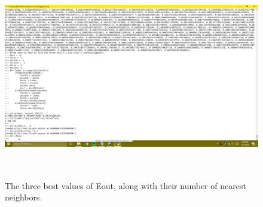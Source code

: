 \documentclass[a4paper]{article}
\begin{document}
\begin{figure}
  \includegraphics[width=\linewidth,height=9cm]{Best.png}
  \caption{The three best values of Eout, along with their number of nearest neighbors.}
  \label{fig:figure_1}
\end{figure}
\end{document}
